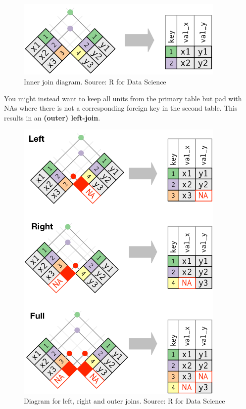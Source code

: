 \documentclass[
  letterpaper,
  DIV=11,
  numbers=noendperiod]{scrreprt}
\begin{document}
\begin{figure}[H]

{\centering \includegraphics[width=0.9\textwidth,height=\textheight]{images/301-edav-wrangling/join-inner.png}

}

\caption{Inner join diagram. Source: R for Data Science}

\end{figure}%

You might instead want to keep all units from the primary table but pad
with NAs where there is not a corresponding foreign key in the second
table. This results in an \textbf{(outer) left-join}.

\begin{figure}[H]

{\centering \includegraphics[width=0.9\textwidth,height=\textheight]{images/301-edav-wrangling/join-left-right-full.png}

}

\caption{Diagram for left, right and outer joins. Source: R for Data
Science}

\end{figure}%
\end{document}
